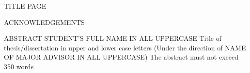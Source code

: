 TITLE PAGE
\newpage

ACKNOWLEDGEMENTS
\newpage

ABSTRACT
STUDENT’S FULL NAME IN ALL UPPERCASE
Title of thesis/dissertation in upper and lower case letters
(Under the direction of NAME OF MAJOR ADVISOR IN ALL UPPERCASE)
The abstract must not exceed 350 words
\newpage

\tableofcontents
\newpage

\listoftables
\newpage

\listoffigures
\newpage
